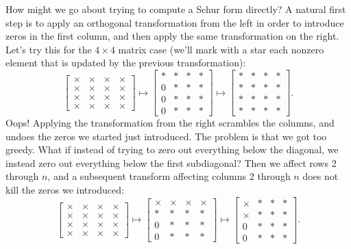 \documentclass[12pt, leqno]{article}
\begin{document}
How might we go about trying to compute a Schur form directly?  A
natural first step is to apply an orthogonal transformation from the
left in order to introduce zeros in the first column, and then apply
the same transformation on the right.  Let's try this for the $4
\times 4$ matrix case (we'll mark with a star each nonzero element
that is updated by the previous transformation):
\[
\begin{bmatrix}
  \times & \times & \times & \times \\
  \times & \times & \times & \times \\
  \times & \times & \times & \times \\
  \times & \times & \times & \times
\end{bmatrix} \mapsto
\begin{bmatrix}
  * & * & * & * \\
  0 & * & * & * \\
  0 & * & * & * \\
  0 & * & * & *
\end{bmatrix} \mapsto
\begin{bmatrix}
  * & * & * & * \\
  * & * & * & * \\
  * & * & * & * \\
  * & * & * & *
\end{bmatrix}.
\]
Oops!  Applying the transformation from the right scrambles the
columns, and undoes the zeros we started just introduced.  The
problem is that we got too greedy.  What if instead of trying to
zero out everything below the diagonal, we instead zero out everything
below the first subdiagonal?  Then we affect rows 2 through $n$,
and a subsequent transform affecting columns 2 through $n$ does not
kill the zeros we introduced:
\[
\begin{bmatrix}
  \times & \times & \times & \times \\
  \times & \times & \times & \times \\
  \times & \times & \times & \times \\
  \times & \times & \times & \times
\end{bmatrix} \mapsto
\begin{bmatrix}
  \times & \times & \times & \times \\
  * & * & * & * \\
  0 & * & * & * \\
  0 & * & * & *
\end{bmatrix} \mapsto
\begin{bmatrix}
  \times & * & * & * \\
  \times & * & * & * \\
  0 & * & * & * \\
  0 & * & * & *
\end{bmatrix}.
\]
\end{document}
